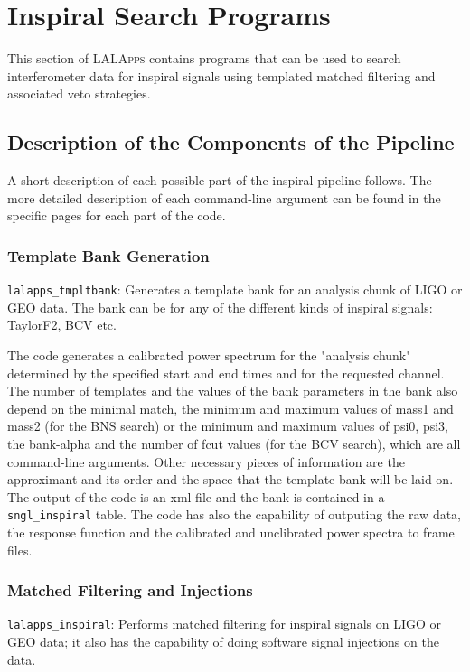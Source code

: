 \chapter{Inspiral Search Programs}
\label{chapter:inspiral}

This section of \textsc{LALApps} contains programs that can be used to search
interferometer data for inspiral signals using templated matched filtering and
associated veto strategies.

\section{Description of the Components of the Pipeline}

A short description of each possible part of the inspiral pipeline follows. 
The more detailed description of each command-line argument can be found in 
the specific pages for each part of the code.

\subsection{Template Bank Generation}

\texttt{lalapps\_tmpltbank}: Generates a template bank for an analysis
chunk of LIGO or GEO data. The bank can be for any of the different kinds of
inspiral signals: TaylorF2, BCV etc.

The code generates a calibrated power spectrum for the "analysis chunk"
determined by the specified start and 
end times and for the requested channel. The number of templates and the
values of the bank parameters in the bank also depend on the minimal 
match, the
minimum and maximum values of mass1 and mass2 (for the BNS search) or the 
minimum and maximum values of psi0, psi3, the bank-alpha and the number of
fcut values (for the BCV search), which are all command-line arguments.
Other necessary pieces of information are the approximant and its order and
the space that the template bank will be laid on. The output of the code is
an xml file and the bank is contained in a \verb$sngl_inspiral$ table. The code has
also the capability of outputing the raw data, the response function and the 
calibrated and unclibrated power spectra to frame files.

\subsection{Matched Filtering and Injections}

\texttt{lalapps\_inspiral}: Performs matched filtering for inspiral signals on
LIGO or GEO data; it also has the capability of doing software signal injections on 
the data.

